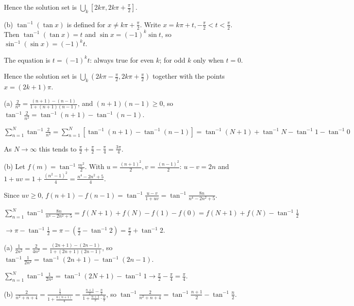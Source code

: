   Hence the solution set is $\bigcup_k\left[2k\pi, 2k\pi + \frac{\pi}{2}\right]$.

  (b) $\tan^{-1}(\tan x)$ is defined for $x\neq k\pi + \frac{\pi}{2}$. Write $x = k\pi + t, -\frac{\pi}{2} < t <
  \frac{\pi}{2}$. Then $\tan^{-1}(\tan x) = t$ and $\sin x = (-1)^k\sin t$, so $\sin^{-1}(\sin x) = (-1)^kt$.

  The equation is $t = (-1)^kt$: always true for even $k$; for odd $k$ only when $t = 0$.

  Hence the solution set is $\bigcup_k\left(2k\pi - \frac{\pi}{2}, 2k\pi + \frac{\pi}{2}\right)$ together with
  the points $x = (2k + 1)\pi$.
\item (a) $\frac{2}{n^2} = \frac{(n + 1) - (n - 1)}{1 + (n + 1)(n - 1)}$, and $(n + 1)(n - 1)\ge 0$, so
  $\tan^{-1}\frac{2}{n^2} = \tan^{-1}(n + 1) - \tan^{-1}(n - 1)$.

  $\displaystyle\sum_{n = 1}^N\tan^{-1}\frac{2}{n^2} = \sum_{n = 1}^N\left[\tan^{-1}(n + 1) - \tan^{-1}(n -
  1)\right] = \tan^{-1}(N + 1) + \tan^{-1}N - \tan^{-1}1 - \tan^{-1}0$

  As $N\rightarrow\infty$ this tends to $\frac{\pi}{2} + \frac{\pi}{2} - \frac{\pi}{4} = \frac{3\pi}{4}$.

  (b) Let $f(m) = \tan^{-1}\frac{m^2}{2}$. With $u = \frac{(n + 1)^2}{2}, v = \frac{(n - 1)^2}{2}$: $u - v = 2n$ and
  $1 + uv = 1 + \frac{(n^2 - 1)^2}{4} = \frac{n^4 - 2n^2 + 5}{4}$.

  Since $uv\ge 0$, $f(n + 1) - f(n - 1) = \tan^{-1}\frac{u - v}{1 + uv} = \tan^{-1}\frac{8n}{n^4 - 2n^2 + 5}$.

  $\displaystyle\sum_{n = 1}^N\tan^{-1}\frac{8n}{n^4 - 2n^2 + 5} = f(N + 1) + f(N) - f(1) - f(0) = f(N + 1) + f(N) -
  \tan^{-1}\frac{1}{2}$

  $\rightarrow\pi - \tan^{-1}\frac{1}{2} = \pi - \left(\frac{\pi}{2} - \tan^{-1}2\right) = \frac{\pi}{2} +
  \tan^{-1}2$.
\item (a) $\frac{1}{2n^2} = \frac{2}{4n^2} = \frac{(2n + 1) - (2n - 1)}{1 + (2n + 1)(2n - 1)}$, so
  $\tan^{-1}\frac{1}{2n^2} = \tan^{-1}(2n + 1) - \tan^{-1}(2n - 1)$.

  $\displaystyle\sum_{n = 1}^N\tan^{-1}\frac{1}{2n^2} = \tan^{-1}(2N + 1) - \tan^{-1}1\rightarrow\frac{\pi}{2} -
  \frac{\pi}{4} = \frac{\pi}{4}$.

  (b) $\frac{2}{n^2 + n + 4} = \frac{\frac{1}{2}}{1 + \frac{n(n + 1)}{4}} = \frac{\frac{n + 1}{2} - \frac{n}{2}}{1 +
  \frac{n + 1}{2}\cdot\frac{n}{2}}$, so $\tan^{-1}\frac{2}{n^2 + n + 4} = \tan^{-1}\frac{n + 1}{2} -
  \tan^{-1}\frac{n}{2}$.

